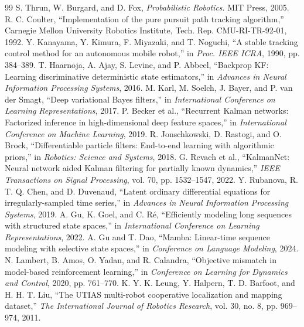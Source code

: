 \documentclass[11pt]{article}
\begin{document}
\clearpage
\begin{thebibliography}{99}
\small
{} S. Thrun, W. Burgard, and D. Fox, \emph{Probabilistic Robotics}. MIT Press, 2005.
 R. C. Coulter, ``Implementation of the pure pursuit path tracking algorithm,'' Carnegie Mellon University Robotics Institute, Tech. Rep. CMU-RI-TR-92-01, 1992.
 Y. Kanayama, Y. Kimura, F. Miyazaki, and T. Noguchi, ``A stable tracking control method for an autonomous mobile robot,'' in \emph{Proc. IEEE ICRA}, 1990, pp. 384--389.
 T. Haarnoja, A. Ajay, S. Levine, and P. Abbeel, ``Backprop KF: Learning discriminative deterministic state estimators,'' in \emph{Advances in Neural Information Processing Systems}, 2016.
 M. Karl, M. Soelch, J. Bayer, and P. van der Smagt, ``Deep variational Bayes filters,'' in \emph{International Conference on Learning Representations}, 2017.
 P. Becker et al., ``Recurrent Kalman networks: Factorized inference in high-dimensional deep feature spaces,'' in \emph{International Conference on Machine Learning}, 2019.
 R. Jonschkowski, D. Rastogi, and O. Brock, ``Differentiable particle filters: End-to-end learning with algorithmic priors,'' in \emph{Robotics: Science and Systems}, 2018.
 G. Revach et al., ``KalmanNet: Neural network aided Kalman filtering for partially known dynamics,'' \emph{IEEE Transactions on Signal Processing}, vol. 70, pp. 1532--1547, 2022.
 Y. Rubanova, R. T. Q. Chen, and D. Duvenaud, ``Latent ordinary differential equations for irregularly-sampled time series,'' in \emph{Advances in Neural Information Processing Systems}, 2019.
 A. Gu, K. Goel, and C. R\'e, ``Efficiently modeling long sequences with structured state spaces,'' in \emph{International Conference on Learning Representations}, 2022.
 A. Gu and T. Dao, ``Mamba: Linear-time sequence modeling with selective state spaces,'' in \emph{Conference on Language Modeling}, 2024.
 N. Lambert, B. Amos, O. Yadan, and R. Calandra, ``Objective mismatch in model-based reinforcement learning,'' in \emph{Conference on Learning for Dynamics and Control}, 2020, pp. 761--770.
 K. Y. K. Leung, Y. Halpern, T. D. Barfoot, and H. H. T. Liu, ``The UTIAS multi-robot cooperative localization and mapping dataset,'' \emph{The International Journal of Robotics Research}, vol. 30, no. 8, pp. 969--974, 2011.
\end{thebibliography}
\end{document}
